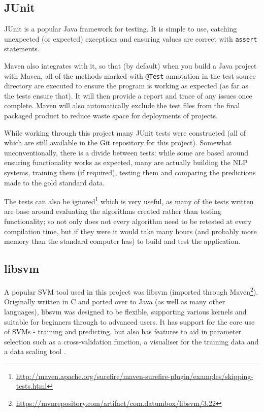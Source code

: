 \subsection*{JUnit}
JUnit is a popular Java framework for testing. It is simple to use, catching unexpected (or expected) exceptions and ensuring values are correct with \texttt{assert} statements. 

Maven also integrates with it, so that (by default) when you build a Java project with Maven, all of the methods marked with \texttt{@Test} annotation in the test source directory are executed to ensure the program is working as expected (as far as the tests ensure that). It will then provide a report and trace of any issues once complete. Maven will also automatically exclude the test files from the final packaged product to reduce waste space for deployments of projects. 

While working through this project many JUnit tests were constructed (all of which are still available in the Git repository for this project). Somewhat unconventionally, there is a divide between tests: while some are based around ensuring functionality works as expected, many are actually building the NLP systems, training them (if required), testing them and comparing the predictions made to the gold standard data.

The tests can also be ignored\footnote{\href{http://maven.apache.org/surefire/maven-surefire-plugin/examples/skipping-tests.html}{http://maven.apache.org/surefire/maven-surefire-plugin/examples/skipping-tests.html}} which is very useful, as many of the tests written are base around evaluating the algorithms created rather than testing functionality; so not only does not every algorithm need to be retested at every compilation time, but if they were it would take many hours (and probably more memory than the standard computer has) to build and test the application. 

\subsection*{libsvm}
A popular SVM tool used in this project was libsvm (imported through Maven\footnote{\href{https://mvnrepository.com/artifact/com.datumbox/libsvm/3.22}{https://mvnrepository.com/artifact/com.datumbox/libsvm/3.22}}). Originally written in C and ported over to Java (as well as many other languages), libsvm was designed to be flexible, supporting various kernels and suitable for beginners through to advanced users. It has support for the core use of SVMs - training and predicting, but also has features to aid in parameter selection such as a cross-validation function, a visualiser for the training data and a data scaling tool \cite{ChangChih-ChungandLin2011}.

